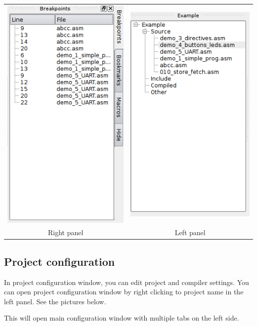     \begin{table}[h!]
        \begin{tabular}{cc}
            \includegraphics[width=.33\textwidth]{img/right_panel.png}
                &
            \includegraphics[width=.33\textwidth]{img/left_panel.png}
                \\ 
            Right panel & Left panel
        \end{tabular}
    \end{table}

    
\clearpage
\enlargethispage{6\baselineskip}
\subsection{Project configuration}
    In project configuration window, you can edit project and compiler settings. You can open project configuration window by right clicking to project name in the left panel. See the pictures below.

    This will open main configuration window with multiple tabs on the left side.

